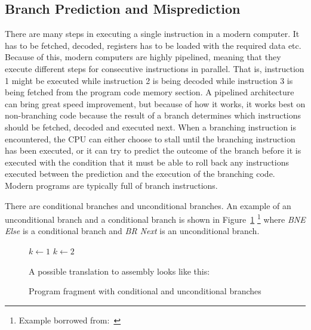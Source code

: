 \subsection{Branch Prediction and Misprediction}
There are many steps in executing a single instruction in a modern computer.
It has to be fetched, decoded, registers has to be loaded with the required data etc.
Because of this, modern computers are highly pipelined, meaning that they execute different steps for consecutive instructions in parallel.
That is, instruction 1 might be executed while instruction 2 is being decoded while instruction 3 is being fetched from the program code memory section.
A pipelined architecture can bring great speed improvement, but because of how it works, it works best on non-branching code because the result of a branch determines which instructions should be fetched, decoded and executed next.
When a branching instruction is encountered, the CPU can either choose to stall until the branching instruction has been executed, or it can try to predict the outcome of the branch before it is executed with the condition that it must be able to roll back any instructions executed between the prediction and the execution of the branching code.
Modern programs are typically full of branch instructions.

There are conditional branches and unconditional branches. 
An example of an unconditional branch and a conditional branch is shown in Figure~\ref{fig:branchexample} \footnote{Example borrowed from:~\citep[Section~4.5.2]{Tanenbaum}} where \textit{BNE Else} is a conditional branch and \textit{BR Next} is an unconditional branch.

\begin{figure}
\begin{algorithmic}
	\State $k \gets 1$
\Else
	\State $k \gets 2$
\EndIf
\end{algorithmic}
\vspace{0.3cm}
\noindent
A possible translation to assembly looks like this:
\vspace{0.3cm}
\begin{compactenum}
\item \itab{ }  
\item \itab{ }  
\item {}  
\item \itab{ }  
\item {}  
\item {}
\end{compactenum}
\caption{Program fragment with conditional and unconditional branches}
\label{fig:branchexample}
\end{figure}

